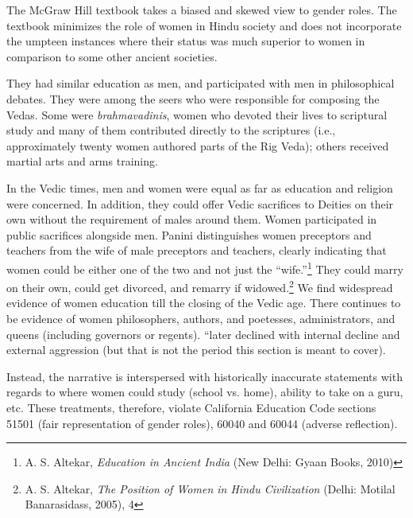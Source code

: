 The McGraw Hill textbook takes a biased and skewed view to gender roles. The textbook minimizes the role of women in Hindu society and does not incorporate the umpteen instances where their status was much superior to women in comparison to some other ancient societies.  

They had similar education as men, and participated with men in philosophical debates. They were among the seers who were responsible for composing the Vedas. Some were \textit{brahmavadinis},  women who devoted their lives to scriptural study and many of them contributed directly to the scriptures (i.e., approximately twenty women authored parts of the Rig Veda); others received martial arts and arms training.

In the Vedic times, men and women were equal as far as education and religion were concerned. In addition, they could offer Vedic sacrifices to Deities on their own without the requirement of males around them. Women participated in public sacrifices alongside men. Panini distinguishes women preceptors and teachers from the wife of male preceptors and teachers, clearly indicating that women could be either one of the two and not just the “wife.”\footnote{A. S. Altekar, \textit{Education in Ancient India} (New Delhi: Gyaan Books, 2010)} They could marry on their own, could get divorced, and remarry if widowed.\footnote{A. S. Altekar, \textit{The Position of Women in Hindu Civilization} (Delhi: Motilal Banarasidass, 2005), 4} We find widespread evidence of women education till the closing of the Vedic age. There continues to be evidence of women philosophers, authors, and poetesses, administrators, and queens (including governors or regents). “later declined with internal decline and external aggression (but that is not the period this section is meant to cover).

Instead, the narrative is interspersed with historically inaccurate statements with regards to where women could study (school vs. home), ability to take on a guru, etc. These treatments, therefore, violate California Education Code sections 51501 (fair representation of gender roles), 60040 and 60044 (adverse reflection).  

